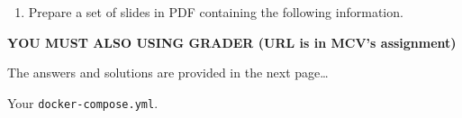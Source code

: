 \documentclass[a4paper, 10pt]{article}
\begin{document}
\begin{enumerate}
	\item Prepare a set of slides in PDF containing the following information.
\end{enumerate}

\begin{center}
	\par\noindent\textbf{\color{red} YOU MUST ALSO USING GRADER (URL is in MCV's assignment)}
\end{center}

\begin{flushright}
	The answers and solutions are provided in the next page\dots
\end{flushright}

\newpage

\begin{problem}
Your \texttt{docker-compose.yml}.
\end{problem}
\end{document}
